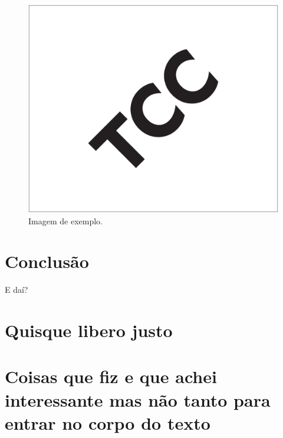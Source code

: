 \documentclass[12pt, %
openright, 
oneside, %
a4paper,    %
brazil]{facom-ufu-abntex2}
\begin{document}
\begin{figure}[!ht]
	\centering
	\includegraphics[width=0.55\linewidth]{imagemExemplo.pdf}
	\caption[Isso é o que aparece no sumário]{Imagem de exemplo.}
	\label{fig:graficosVariandoTamanhoRede}
\end{figure}


\chapter[Conclusão]{Conclusão}
E daí?

\postextual




\begin{apendicesenv}

	\partapendices

	\chapter{Quisque libero justo}

	\lipsum[50]

	\chapter{Coisas que fiz e que achei interessante mas não tanto para entrar no corpo do texto}
	\lipsum[55-57]

\end{apendicesenv}
\end{document}
